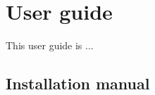 \chapter{User guide}
\label{user-guide}

This user guide is ...

\section{Installation manual}
\label{installation-manual}


